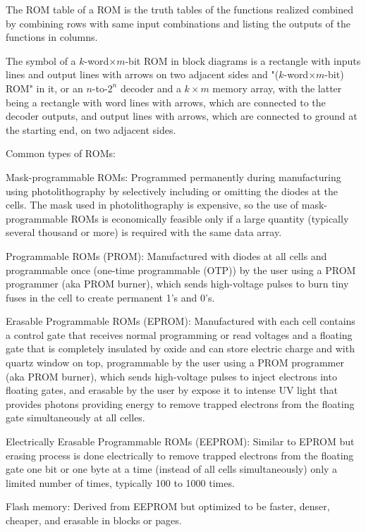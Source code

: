 \documentclass[a4paper,12pt]{report}
\begin{document}
The ROM table of a ROM is the truth tables of the functions realized combined by combining rows with same input combinations and listing the outputs of the functions in columns.

The symbol of a $k$-word$\times m$-bit ROM in block diagrams is a rectangle with inputs lines and output lines with arrows on two adjacent sides and "($k$-word$\times m$-bit) ROM" in it, or an $n$-to-$2^n$ decoder and a $k\times m$ memory array, with the latter being a rectangle with word lines with arrows, which are connected to the decoder outputs, and output lines with arrows, which are connected to ground at the starting end, on two adjacent sides.

Common types of ROMs:
\bit
\item Mask-programmable ROMs: Programmed permanently during manufacturing using photolithography by selectively including or omitting the diodes at the cells. The mask used in photolithography is expensive, so the use of mask-programmable ROMs is economically feasible only if a large quantity (typically several thousand or more) is required with the same data array.
\item Programmable ROMs (PROM): Manufactured with diodes at all cells and programmable once (one-time programmable (OTP)) by the user using a PROM programmer (aka PROM burner), which sends high-voltage pulses to burn tiny fuses in the cell to create permanent 1's and 0's.
\item Erasable Programmable ROMs (EPROM): Manufactured with each cell contains a control gate that receives normal programming or read voltages and a floating gate that is completely insulated by oxide and can store electric charge and with quartz window on top, programmable by the user using a PROM programmer (aka PROM burner), which sends high-voltage pulses to inject electrons into floating gates, and erasable by the user by expose it to intense UV light that provides photons providing energy to remove trapped electrons from the floating gate simultaneously at all celles.
\item Electrically Erasable Programmable ROMs (EEPROM): Similar to EPROM but erasing process is done electrically to remove trapped electrons from the floating gate one bit or one byte at a time (instead of all cells simultaneously) only a limited number of times, typically 100 to 1000 times.
\item Flash memory: Derived from EEPROM but optimized to be faster, denser, cheaper, and erasable in blocks or pages.
\end{document}
